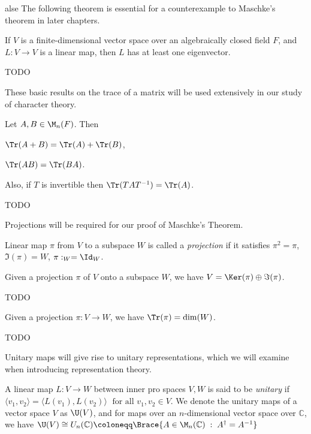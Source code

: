 \documentclass[../Project.tex]{subfiles}
\begin{document}
alse
The following theorem is essential for a counterexample to Maschke's theorem in later chapters.
\begin{theo}
	If $V$ is a finite-dimensional vector space over an algebraically closed field $F$, and $L : V \to V$ is a linear map, then $L$ has at least one eigenvector.
	\label{eigenvectheo}
\end{theo}
\begin{proo*}
	TODO
\end{proo*}

These basic results on the trace of a matrix will be used extensively in our study of character theory.
\begin{prop}
\label{7}
	Let $A,B \in \M_n(F)$. Then
	\begin{mitem}
		\item $\Tr(A + B) = \Tr(A) + \Tr(B)$,
		\item $\Tr(AB) = \Tr(BA)$.
	\end{mitem}

	Also, if $T$ is invertible then $\Tr(TAT^{-1}) = \Tr(A)$.
\end{prop}
\begin{proo*}
TODO
\end{proo*}

Projections will be required for our proof of Maschke's Theorem.
\begin{defi}
	Linear map $\pi$ from $V$ to a subspace $W$ is called a \textit{projection} if it satisfies $\pi^2 = \pi$, $\Im(\pi) = W$, $\pi:_W = \Id_W$.
\end{defi}
\begin{theo}
	Given a projection $\pi$ of $V$ onto a subspace $W$, we have $V = \Ker(\pi) \oplus \Im(\pi)$.
\end{theo}
\begin{proo*}
	TODO
\end{proo*}
\begin{prop}
	Given a projection $\pi : V \to W$, we have $\Tr(\pi) = \dim(W)$. \label{Trproj}
\end{prop}
\begin{proo*}
TODO
\end{proo*}




Unitary maps will give rise to unitary representations, which we will examine when introducing representation theory.
\begin{defi}
	A linear map $L : V \to W$ between inner pro spaces $V,W$ is said to be \textit{unitary} if $\langle v_1, v_2\rangle  = \langle L(v_1), L(v_2) \rangle\;\text{ for all } v_1,v_2 \in V$.
	We denote the unitary maps of a vector space $V$ as $\U(V)$, and for maps over an $n$-dimensional vector space over $\mathbb{C}$, we have $\U(V) \cong U_n(\mathbb{C}) \coloneqq \Brace{A \in \M_n(\mathbb{C}) \;:\; A^\dagger = A^{-1}}$ 
\end{defi}
\end{document}
